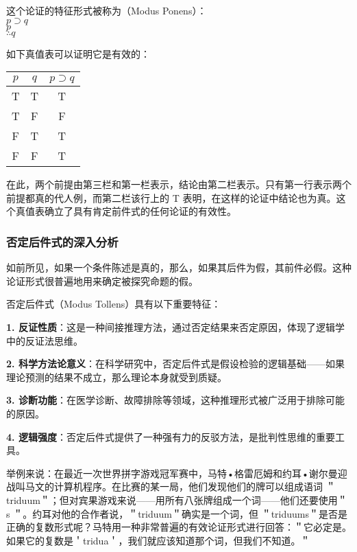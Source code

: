这个论证的特征形式被称为（Modus Ponens）：\\
$p \supset q$\\
$p$\\
$\therefore q$

如下真值表可以证明它是有效的：

\begin{center}
\begin{tabular}{|ccc|}
\hline
$p$ & $q$ & $p \supset q$ \\
\hline
T & T & T \\
T & F & F \\
F & T & T \\
F & F & T \\
\hline
\end{tabular}
\end{center}

在此，两个前提由第三栏和第一栏表示，结论由第二栏表示。只有第一行表示两个前提都真的代人例，而第二栏该行上的 T 表明，在这样的论证中结论也为真。这个真值表确立了具有肯定前件式的任何论证的有效性。

\subsubsection{否定后件式的深入分析}

如前所见，如果一个条件陈述是真的，那么，如果其后件为假，其前件必假。这种论证形式很普遍地用来确定被探究命题的假。

\begin{theorembox}[title=否定后件式的逻辑特征]
否定后件式（Modus Tollens）具有以下重要特征：

\textbf{1. 反证性质}：这是一种间接推理方法，通过否定结果来否定原因，体现了逻辑学中的反证法思维。

\textbf{2. 科学方法论意义}：在科学研究中，否定后件式是假设检验的逻辑基础——如果理论预测的结果不成立，那么理论本身就受到质疑。

\textbf{3. 诊断功能}：在医学诊断、故障排除等领域，这种推理形式被广泛用于排除可能的原因。

\textbf{4. 逻辑强度}：否定后件式提供了一种强有力的反驳方法，是批判性思维的重要工具。
\end{theorembox}

举例来说：在最近一次世界拼字游戏冠军赛中，马特•格雷厄姆和约耳•谢尔曼迎战叫马文的计算机程序。在比赛的某一局，他们发现他们的牌可以组成语词 ＂triduum＂；但对宾果游戏来说——用所有八张牌组成一个词——他们还要使用＂ s ＂。约耳对他的合作者说，＂triduum＂确实是一个词，但 ＂triduums＂是否是正确的复数形式呢？马特用一种非常普遍的有效论证形式进行回答：＂它必定是。如果它的复数是＇tridua＇，我们就应该知道那个词，但我们不知道。＂\cite{carroll1896}

